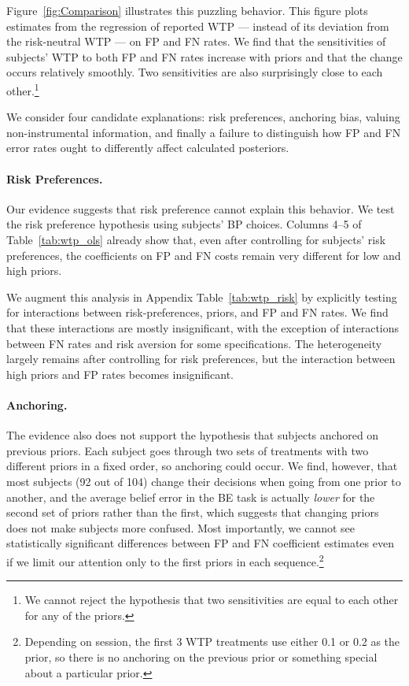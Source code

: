 \documentclass[12pt,a4paper]{article}
\begin{document}
Figure~\ref{fig:Comparison} illustrates this puzzling behavior. This figure plots estimates from the regression of reported WTP --- instead of its deviation from the risk-neutral WTP --- on FP and FN rates. We find that the sensitivities of subjects' WTP to both FP and FN rates increase with priors and that the change occurs relatively smoothly. Two sensitivities are also surprisingly close to each other.\footnote{We cannot reject the hypothesis that two sensitivities are equal to each other for any of the priors.} 

We consider four candidate explanations: risk preferences, anchoring bias, valuing non-instrumental information, and finally a failure to distinguish how FP and FN error rates ought to differently affect calculated posteriors. 

\paragraph{Risk Preferences.} Our evidence suggests that risk preference cannot explain this behavior. We test the risk preference hypothesis using subjects' BP choices. Columns 4--5 of Table~\ref{tab:wtp_ols} already show that, even after controlling for subjects' risk preferences, the coefficients on FP and FN costs remain very different for low and high priors.

We augment this analysis in Appendix Table~\ref{tab:wtp_risk} by explicitly testing for interactions between risk-preferences, priors, and FP and FN rates. We find that these interactions are mostly insignificant, with the exception of interactions between FN rates and risk aversion for some specifications. The heterogeneity largely remains after controlling for risk preferences, but the interaction between high priors and FP rates becomes insignificant.

\paragraph{Anchoring.} The evidence also does not support the hypothesis that subjects anchored on previous priors. Each subject goes through two sets of treatments with two different priors in a fixed order, so anchoring could occur.  We find, however, that most subjects (92 out of 104) change their decisions when going from one prior to another, and the average belief error in the BE task is actually \emph{lower} for the second set of priors rather than the first, which suggests that changing priors does not make subjects more confused. Most importantly, we cannot see statistically significant differences between FP and FN coefficient estimates even if we limit our attention only to the first priors in each sequence.\footnote{Depending on session, the first 3 WTP treatments use either 0.1 or 0.2 as the prior, so there is no anchoring on the previous prior or something special about a particular prior.}
\end{document}
